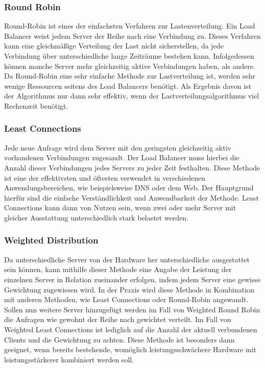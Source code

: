 \documentclass[letterpaper, 12pt]{article}
\let\tempsubsubsection\subsubsection
\renewcommand\subsubsection[1]{\vspace{0cm}\tempsubsubsection{#1}\vspace{0cm}}
\begin{document}
\subsubsection{Round Robin}

Round-Robin ist eines der einfachsten Verfahren zur Lastenverteilung. Ein Load Balancer weist jedem
Server der Reihe nach eine Verbindung zu. Dieses Verfahren kann eine gleichmäßige Verteilung der
Last nicht sicherstellen, da jede Verbindung über unterschiedliche lange Zeiträume bestehen kann.
Infolgedessen können manche Server mehr gleichzeitig aktive Verbindungen haben, als andere. Da Round-Robin eine sehr einfache Methode zur Lastverteilung ist, werden sehr wenige Ressourcen
seitens des Load Balancers benötigt. Als Ergebnis davon ist der Algorithmus nur dann sehr effektiv, wenn
der Lastverteilungsalgorithmus viel Rechenzeit benötigt. \cite{ausarbeitunglb}

\subsubsection{Least Connections}

Jede neue Anfrage wird dem Server mit den geringsten gleichzeitig aktiv vorhandenen Verbindungen
zugesandt. Der Load Balancer muss hierbei die Anzahl dieser Verbindungen jedes Servers
zu jeder Zeit festhalten. Diese Methode ist eine der effektivsten und öftesten verwendet in verschiedenen
Anwendungsbereichen, wie beispielsweise DNS oder dem Web. Der Hauptgrund hierfür sind die
einfache Verständlichkeit und Anwendbarkeit der Methode. Least Connections kann dann von Nutzen sein, wenn zwei oder mehr Server mit gleicher Ausstattung unterschiedlich stark belastet werden. \cite{ausarbeitunglb}

\subsubsection{Weighted Distribution}

Da unterschiedliche Server von der Hardware her unterschiedliche ausgestattet sein können, kann mithilfe dieser
Methode eine Angabe der Leistung der einzelnen Server in Relation zueinander erfolgen, indem
jedem Server eine gewisse Gewichtung zugewiesen wird. In der Praxis wird diese Methode in Kombination mit anderen Methoden, wie Least Connections
oder Round-Robin angewandt. Sollen nun weitere Server hinzugefügt werden im Fall von Weighted
Round Robin die Anfragen wie gewohnt der Reihe nach gewichtet verteilt. Im Fall von Weighted
Least Connections ist lediglich auf die Anzahl der aktuell verbundenen Clients und die Gewichtung zu achten. Diese Methode ist besonders dann geeignet, wenn bereits bestehende, womöglich leistungsschwächere Hardware mit leistungsstärkerer kombiniert werden soll. \cite{ausarbeitunglb}
\end{document}
